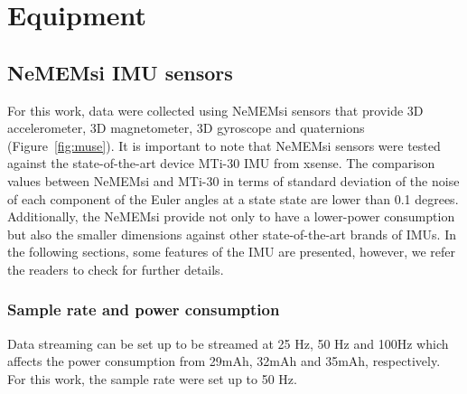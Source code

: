 		\chapter{Equipment} \label{appendix:b}



\graphicspath{{figs/appendixB/PDF/}}

%
%


\section{NeMEMsi IMU sensors}  \label{appendix:imus}
For this work, data were collected using NeMEMsi sensors \cite{Comotti2014}
that provide 3D accelerometer, 3D magnetometer, 3D gyroscope and quaternions
(Figure~\ref{fig:muse}).
It is important to note that NeMEMsi sensors 
were tested against the state-of-the-art device MTi-30 IMU from xsense.
The comparison values between NeMEMsi and MTi-30 in terms of standard deviation 
of the noise of each component of the Euler angles at a state state are lower 
than 0.1 degrees. 
Additionally, the NeMEMsi provide not only to have a lower-power consumption 
but also the smaller dimensions against other state-of-the-art brands of IMUs.
In the following sections, some features of the IMU are presented,
however, we refer the readers to check \cite{Comotti2014} for further details.

\subsection*{Sample rate and power consumption}
Data streaming can be set up to be streamed at 25 Hz, 50 Hz and 100Hz which
affects the power consumption from 29mAh, 32mAh and 35mAh, respectively.
For this work, the sample rate were set up to 50 Hz.

